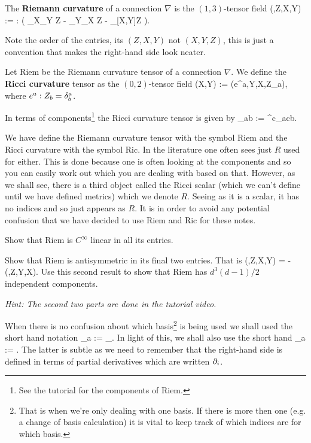     The \textbf{Riemann curvature} of a connection $\nabla$ is the $(1,3)$-tensor field
    \bse
        \Riem(\omega,Z,X,Y) := \omega : \big( \nabla_X\nabla_Y Z - \nabla_Y\nabla_X Z - \nabla_{[X,Y]}Z \big).
    \ese 
\ed 

Note the order of the entries, its $(Z,X,Y)$ not $(X,Y,Z)$, this is just a convention that makes the right-hand side look neater. 

    Let Riem be the Riemann curvature tensor of a connection $\nabla$. We define the \textbf{Ricci curvature} tensor as the $(0,2)$-tensor field 
    \bse 
        \Ric(X,Y) := \Riem(e^a,Y,X,Z_a),
    \ese 
    where $e^a:Z_b = \delta^a_b$.
\ed

In terms of components\footnote{See the tutorial for the components of Riem.} the Ricci curvature tensor is given by 
\bse 
    \Ric_{ab} := {\Riem^{c}}_{acb}.
\ese 

\bnn 
    We have define the Riemann curvature tensor with the symbol Riem and the Ricci curvature with the symbol Ric. In the literature one often sees just $R$ used for either. This is done because one is often looking at the components and so you can easily work out which you are dealing with based on that. However, as we shall see, there is a third object called the Ricci scalar (which we can't define until we have defined metrics) which we denote $R$. Seeing as it is a scalar, it has no indices and so just appears as $R$. It is in order to avoid any potential confusion that we have decided to use Riem and Ric for these notes.
\enn 

\bbox 
    Show that Riem is $C^{\infty}$ linear in all its entries.
\ebox 

\bbox
    Show that Riem is antisymmetric in its final two entries. That is 
    \bse 
        \Riem(\omega,Z,X,Y) = - \Riem(\omega,Z,Y,X).
    \ese 
    Use this second result to show that Riem has $d^3(d-1)/2$ independent components. 
    
    \textit{Hint: The second two parts are done in the tutorial video.}
\ebox

\bnn 
    When there is no confusion about which basis\footnote{That is when we're only dealing with one basis. If there is more then one (e.g. a change of basis calculation) it is vital to keep track of which indices are for which basis.} is being used we shall used the short hand notation 
    \bse 
        \nabla_a := \nabla_{}. 
    \ese 
    In light of this, we shall also use the short hand 
    \bse 
        \p_a := .
    \ese 
    The latter is subtle as we need to remember that the right-hand side is defined in terms of partial derivatives which are written $\partial_i$.
\enn

